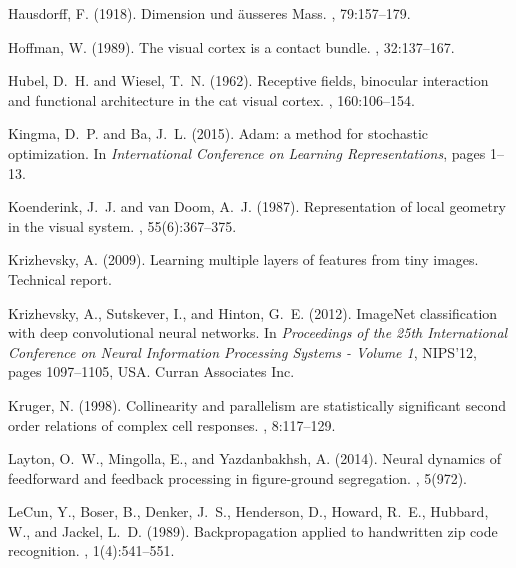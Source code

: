 \documentclass[11pt,oneside,reqno]{amsart}
\begin{document}
\begin{thebibliography}{}
Hausdorff, F. (1918).
\newblock Dimension und \"{a}usseres {M}ass.
, 79:157--179.

Hoffman, W. (1989).
\newblock The visual cortex is a contact bundle.
, 32:137--167.

Hubel, D.~H. and Wiesel, T.~N. (1962).
\newblock Receptive fields, binocular interaction and functional architecture
  in the cat visual cortex.
, 160:106--154.

Kingma, D.~P. and Ba, J.~L. (2015).
\newblock Adam: a method for stochastic optimization.
\newblock In {\em International Conference on Learning Representations}, pages
  1--13.

Koenderink, J.~J. and van Doom, A.~J. (1987).
\newblock Representation of local geometry in the visual system.
, 55(6):367--375.

Krizhevsky, A. (2009).
\newblock Learning multiple layers of features from tiny images.
\newblock Technical report.

Krizhevsky, A., Sutskever, I., and Hinton, G.~E. (2012).
\newblock Image{N}et classification with deep convolutional neural networks.
\newblock In {\em Proceedings of the 25th International Conference on Neural
  Information Processing Systems - Volume 1}, NIPS'12, pages 1097--1105, USA.
  Curran Associates Inc.

Kruger, N. (1998).
\newblock Collinearity and parallelism are statistically significant second
  order relations of complex cell responses.
, 8:117--129.

Layton, O.~W., Mingolla, E., and Yazdanbakhsh, A. (2014).
\newblock Neural dynamics of feedforward and feedback processing in
  figure-ground segregation.
, 5(972).

LeCun, Y., Boser, B., Denker, J.~S., Henderson, D., Howard, R.~E., Hubbard, W.,
  and Jackel, L.~D. (1989).
\newblock Backpropagation applied to handwritten zip code recognition.
, 1(4):541--551.


\end{thebibliography}
\end{document}
